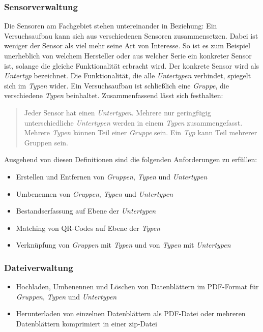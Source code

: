 \documentclass[
]{article}
\providecommand{\tightlist}{%
  \setlength{\itemsep}{0pt}\setlength{\parskip}{0pt}}
\begin{document}
\hypertarget{sensorverwaltung}{%
\subsubsection{Sensorverwaltung}\label{sensorverwaltung}}

Die Sensoren am Fachgebiet stehen untereinander in Beziehung: Ein Versuchsaufbau kann sich aus verschiedenen Sensoren zusammensetzen. Dabei ist weniger der Sensor als viel mehr seine Art von Interesse. So ist es zum Beispiel unerheblich von welchem Hersteller oder aus welcher Serie ein konkreter Sensor ist, solange die gleiche Funktionalität erbracht wird. Der konkrete Sensor wird als \emph{Untertyp} bezeichnet. Die Funktionalität, die alle \emph{Untertypen} verbindet, spiegelt sich im \emph{Typen} wider. Ein Versuchsaufbau ist schließlich eine \emph{Gruppe}, die verschiedene \emph{Typen} beinhaltet. Zusammenfassend lässt sich festhalten:

\begin{quote}
Jeder Sensor hat einen \emph{Untertypen}. Mehrere nur geringfügig unterschiedliche \emph{Untertypen} werden in einem \emph{Typen} zusammengefasst. Mehrere \emph{Typen} können Teil einer \emph{Gruppe} sein. Ein \emph{Typ} kann Teil mehrerer Gruppen sein.
\end{quote}

Ausgehend von diesen Definitionen sind die folgenden Anforderungen zu erfüllen:

\begin{itemize}
\tightlist
\item
  Erstellen und Entfernen von \emph{Gruppen}, \emph{Typen} und \emph{Untertypen}
\item
  Umbenennen von \emph{Gruppen}, \emph{Typen} und \emph{Untertypen}
\item
  Bestandserfassung auf Ebene der \emph{Untertypen}
\item
  Matching von QR-Codes auf Ebene der \emph{Typen}
\item
  Verknüpfung von \emph{Gruppen} mit \emph{Typen} und von \emph{Typen} mit \emph{Untertypen}
\end{itemize}

\hypertarget{dateiverwaltung}{%
\subsubsection{Dateiverwaltung}\label{dateiverwaltung}}

\begin{itemize}
\tightlist
\item
  Hochladen, Umbenennen und Löschen von Datenblättern im PDF-Format für \emph{Gruppen}, \emph{Typen} und \emph{Untertypen}
\item
  Herunterladen von einzelnen Datenblättern als PDF-Datei oder mehreren Datenblättern komprimiert in einer zip-Datei
\end{itemize}
\end{document}
